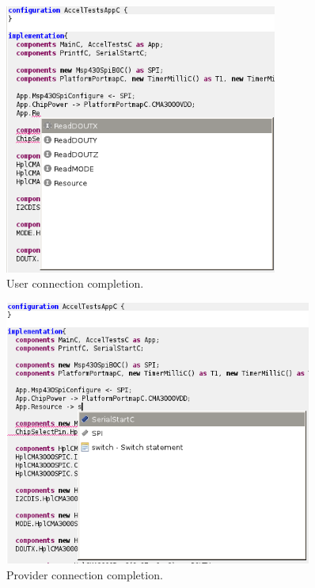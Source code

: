 \begin{figure}[h]
  \centering
  \includegraphics[width=0.8\textwidth]{img/eclipse_compl2.png}
  \caption{User connection completion.}
\end{figure}

\begin{figure}[h]
  \centering
  \includegraphics[width=0.9\textwidth]{img/eclipse_compl3.png}
  \caption{Provider connection completion.}
\end{figure}

